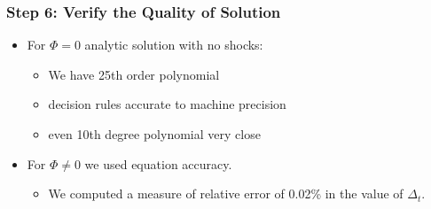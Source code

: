 \documentclass[handout]{beamer}
\begin{document}
\begin{frame}



\end{frame}
\begin{frame}

\frametitle{Step 6: Verify the Quality of Solution}

\begin{itemize}
\item For $\Phi =0$ analytic solution with no shocks:
  \begin{itemize}
  \item We have 25th order polynomial
  \item decision rules accurate to machine precision
  \item even 10th degree polynomial very close
  \end{itemize}
\item For $\Phi \ne 0$ we used equation %
  accuracy.
  \begin{itemize}
  \item We computed a measure of relative error of 0.02\% in the value
    of $\Delta_{t}$.
  \end{itemize}
\end{itemize}












\end{frame}

\end{document}
